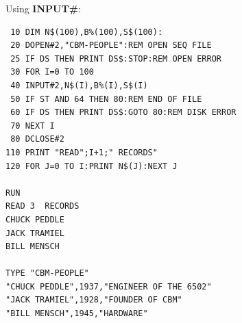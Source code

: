 \begin{description}[leftmargin=2cm,style=nextline]
\item [Example:] Using {\bf INPUT\#}:
\begin{tcolorbox}[colback=black,coltext=white]
\verbatimfont{\codefont}
\begin{verbatim}
 10 DIM N$(100),B%(100),S$(100):
 20 DOPEN#2,"CBM-PEOPLE":REM OPEN SEQ FILE
 25 IF DS THEN PRINT DS$:STOP:REM OPEN ERROR
 30 FOR I=0 TO 100
 40 INPUT#2,N$(I),B%(I),S$(I)
 50 IF ST AND 64 THEN 80:REM END OF FILE
 60 IF DS THEN PRINT DS$:GOTO 80:REM DISK ERROR
 70 NEXT I
 80 DCLOSE#2
110 PRINT "READ";I+1;" RECORDS"
120 FOR J=0 TO I:PRINT N$(J):NEXT J

RUN
READ 3  RECORDS
CHUCK PEDDLE
JACK TRAMIEL
BILL MENSCH

TYPE "CBM-PEOPLE"
"CHUCK PEDDLE",1937,"ENGINEER OF THE 6502"
"JACK TRAMIEL",1928,"FOUNDER OF CBM"
"BILL MENSCH",1945,"HARDWARE"

\end{verbatim}
\end{tcolorbox}
\end{description}


\newpage
